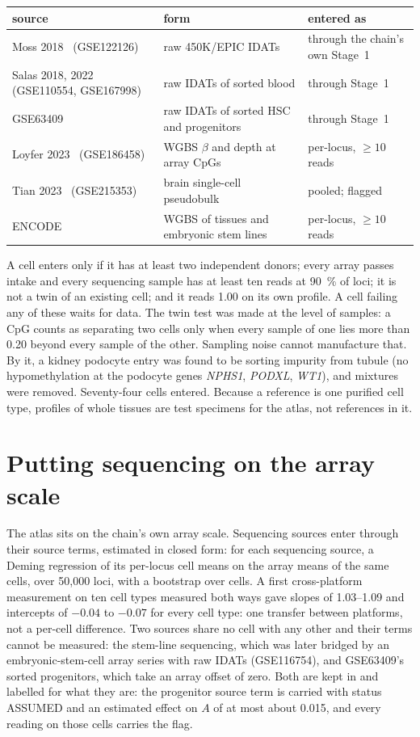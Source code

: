 \begin{center}\small
\begin{tabularx}{\linewidth}{@{}>{\raggedright\arraybackslash}X>{\raggedright\arraybackslash}X>{\raggedright\arraybackslash}X@{}}\toprule
source & form & entered as \\\midrule
Moss 2018~\cite{Moss2018} (GSE122126) & raw 450K/EPIC IDATs & through the chain's own Stage~1 \\
Salas 2018, 2022~\cite{Salas2018,Salas2022} (GSE110554, GSE167998) & raw IDATs of sorted blood & through Stage~1 \\
GSE63409 & raw IDATs of sorted HSC and progenitors & through Stage~1 \\
Loyfer 2023~\cite{Loyfer2023} (GSE186458) & WGBS $\beta$ and depth at array CpGs & per-locus, $\ge10$ reads \\
Tian 2023~\cite{Tian2023} (GSE215353) & brain single-cell pseudobulk & pooled; flagged \\
ENCODE & WGBS of tissues and embryonic stem lines & per-locus, $\ge10$ reads \\\bottomrule
\end{tabularx}
\end{center}
A cell enters only if it has at least two independent donors; every array passes intake and every sequencing sample has at least ten reads at
90~\% of loci; it is not a twin of an existing cell; and it reads 1.00 on its own profile. A cell failing any of these waits for data. The twin
test was made at the level of samples: a CpG counts as separating two cells only when every sample of one lies more than 0.20 beyond every sample of
the other. Sampling noise cannot manufacture that. By it, a kidney podocyte entry was found to be sorting impurity from tubule (no
hypomethylation at the podocyte genes \emph{NPHS1}, \emph{PODXL}, \emph{WT1}), and mixtures were removed. Seventy-four cells entered.
Because a reference is one purified cell type, profiles of whole tissues are test specimens for the atlas, not references in it.

\section{Putting sequencing on the array scale}

The atlas sits on the chain's own array scale. Sequencing sources enter through their source terms, estimated in closed form: for each sequencing
source, a Deming regression of its per-locus cell means on the array means of the same cells, over 50,000 loci, with a bootstrap over cells. A first
cross-platform measurement on ten cell types measured both ways gave slopes of 1.03--1.09 and intercepts of $-0.04$ to $-0.07$ for every cell type:
one transfer between platforms, not a per-cell difference. \measured{} Two sources share no cell with any other and their terms cannot be measured:
the stem-line sequencing, which was later bridged by an embryonic-stem-cell array series with raw IDATs (GSE116754), and GSE63409's sorted
progenitors, which take an array offset of zero. Both are kept in and labelled for what they are: the progenitor source term
is carried with status ASSUMED and an estimated effect on $A$ of at most about 0.015, and every reading on those cells carries the flag.

